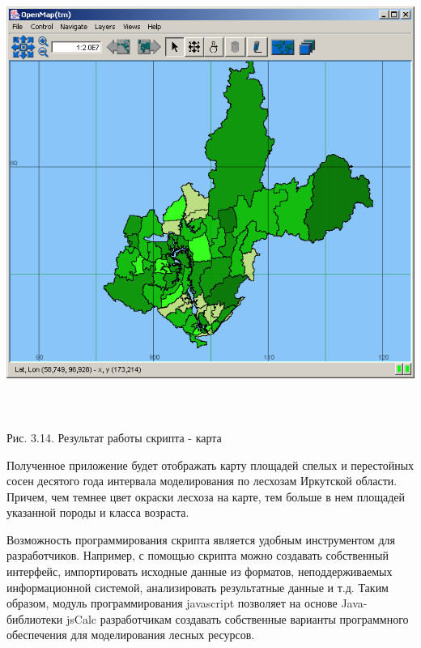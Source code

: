 \documentclass{article}
\begin{document}
\includegraphics[width=452pt, height=412pt, keepaspectratio=true]{asyaDisser9_3-fig011.png}

\begin{center}
Рис. 3.14. Результат работы скрипта - карта
\end{center}

Полученное приложение будет отображать карту 
площадей спелых и перестойных сосен десятого 
года интервала моделирования по лесхозам Иркутской 
области. Причем, чем темнее цвет окраски лесхоза 
на карте, тем больше в нем площадей указанной 
породы и класса возраста.

Возможность программирования скрипта является 
удобным инструментом для разработчиков. Например, 
с помощью скрипта можно создавать собственный 
интерфейс, импортировать исходные данные из 
форматов, неподдерживаемых информационной 
системой, анализировать результатные данные 
и т.д. Таким образом, модуль программирования 
javascript позволяет на основе Java-библиотеки jsCalc 
разработчикам создавать собственные варианты 
программного обеспечения для моделирования 
лесных ресурсов.\label{HToc199746738}
\end{document}
